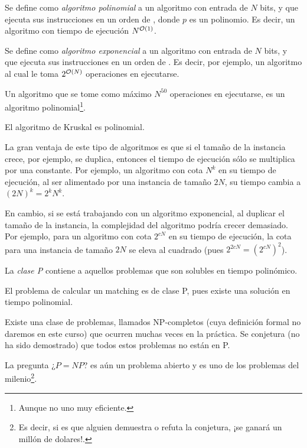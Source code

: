 \begin{defi}
Se define como \textit{algoritmo polinomial} a un algoritmo con entrada de $N$ bits, y que ejecuta sus instrucciones en un orden de \Ord[p(N)], donde $p$ es un polinomio. Es decir, un algoritmo con tiempo de ejecución $N^{\Ord[1]}$.
\end{defi}
\begin{defi}
Se define como \textit{{algoritmo exponencial}} a un algoritmo con entrada de $N$ bits, y que ejecuta sus instrucciones en un orden de \Ord[e^{N}]. Es decir, por ejemplo, un algoritmo al cual le toma $2^{\Ord[N]}$ operaciones en ejecutarse.
\end{defi}
\begin{eje}
Un algoritmo que se tome como máximo $N^{50}$ operaciones en ejecutarse, es un algoritmo polinomial\footnote{Aunque no uno muy eficiente.}.
\end{eje}
\begin{eje}
El algoritmo de Kruskal es polinomial.
\end{eje}
La gran ventaja de este tipo de algoritmos es que si el tamaño de la instancia crece, por ejemplo, se duplica, entonces el tiempo de ejecución sólo se multiplica por una constante. Por ejemplo, un algoritmo con cota $N^k$ en su tiempo de ejecución, al ser alimentado por una instancia de tamaño $2N$, su tiempo cambia a $(2N)^{k}=2^k N^k$.

En cambio, si se está trabajando con un algoritmo exponencial, al duplicar el tamaño de la instancia, la complejidad del algoritmo podría crecer demasiado. Por ejemplo, para un algoritmo con cota $2^{cN}$ en su tiempo de ejecución, la cota para una instancia de tamaño $2N$ se eleva al cuadrado (pues $2^{2cN}=(2^{cN})^2$).

\begin{defi}[Clase P]
La \textit{{clase P}} contiene a aquellos problemas que son solubles en tiempo polinómico.
\end{defi}
\begin{eje}
El problema de calcular un matching es de clase P, pues existe una solución en tiempo polinomial.
\end{eje}

Existe una clase de problemas, llamados NP-completos (cuya definición formal no daremos en este curso) que ocurren muchas veces en la práctica. Se conjetura (no ha sido demostrado) que todos estos problemas no están en P.

\begin{obs}
La pregunta ¿$P=NP$? es aún un problema abierto y es uno de los problemas del milenio\footnote{Es decir, si es que alguien demuestra o refuta la conjetura, ¡se ganará un millón de dolares!.}.
\end{obs}


